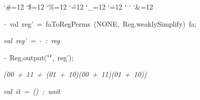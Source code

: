 \begin{list}{}
{\setlength{\leftmargin}{\leftmargini}
\setlength{\rightmargin}{0cm}
\setlength{\itemindent}{0cm}
\setlength{\listparindent}{0cm}
\setlength{\itemsep}{0cm}
\setlength{\parsep}{0cm}
\setlength{\labelsep}{0cm}
\setlength{\labelwidth}{0cm}
\catcode`\#=12
\catcode`\$=12
\catcode`\%=12
\catcode`\^=12
\catcode`\_=12
\catcode`\.=12
\catcode`
\catcode`
\catcode`\&=12
\ttfamily}
\small
\item[]\textsl{-\ }val\ reg'\ =\ faToRegPerms\ (NONE,\ Reg.weaklySimplify)\ fa;
\item[]\textsl{val\ reg'\ =\ -\ :\ reg}
\item[]\textsl{-\ }Reg.output("",\ reg');
\item[]\textsl{(00\ +\ 11\ +\ (01\ +\ 10)(00\ +\ 11)(01\ +\ 10))}
\item[]\textsl{val\ it\ =\ ()\ :\ unit}
\end{list}
